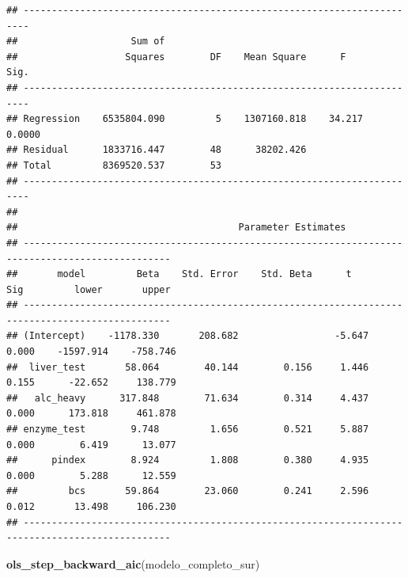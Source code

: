 \documentclass[
]{book}
\newenvironment{Shaded}{\begin{snugshade}}{\end{snugshade}}
\newcommand{\FunctionTok}[1]{\textcolor[rgb]{0.13,0.29,0.53}{\textbf{#1}}}
\newcommand{\NormalTok}[1]{#1}
\begin{document}
\begin{verbatim}
## -----------------------------------------------------------------------
##                    Sum of                                              
##                   Squares        DF    Mean Square      F         Sig. 
## -----------------------------------------------------------------------
## Regression    6535804.090         5    1307160.818    34.217    0.0000 
## Residual      1833716.447        48      38202.426                     
## Total         8369520.537        53                                    
## -----------------------------------------------------------------------
## 
##                                       Parameter Estimates                                        
## ------------------------------------------------------------------------------------------------
##       model         Beta    Std. Error    Std. Beta      t        Sig         lower       upper 
## ------------------------------------------------------------------------------------------------
## (Intercept)    -1178.330       208.682                 -5.647    0.000    -1597.914    -758.746 
##  liver_test       58.064        40.144        0.156     1.446    0.155      -22.652     138.779 
##   alc_heavy      317.848        71.634        0.314     4.437    0.000      173.818     461.878 
## enzyme_test        9.748         1.656        0.521     5.887    0.000        6.419      13.077 
##      pindex        8.924         1.808        0.380     4.935    0.000        5.288      12.559 
##         bcs       59.864        23.060        0.241     2.596    0.012       13.498     106.230 
## ------------------------------------------------------------------------------------------------
\end{verbatim}

\begin{Shaded}
\begin{Highlighting}[]
\FunctionTok{ols\_step\_backward\_aic}\NormalTok{(modelo\_completo\_sur)}
\end{Highlighting}
\end{Shaded}
\end{document}
